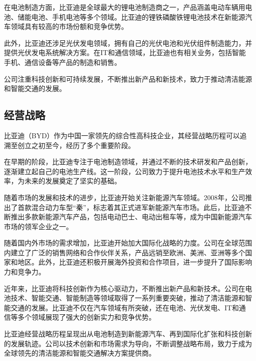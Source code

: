 在电池制造方面，比亚迪是全球最大的锂电池制造商之一，产品涵盖电动车辆用电池、储能电池、手机电池等多个领域。比亚迪的锂铁磷酸铁锂电池技术在新能源汽车领域具有较高的市场份额和竞争优势。

此外，比亚迪还涉足光伏发电领域，拥有自己的光伏电池和光伏组件制造能力，并提供光伏发电系统解决方案。在IT和通信领域，比亚迪也有相关业务，包括智能手机、通信设备等产品的制造和销售。

公司注重科技创新和可持续发展，不断推出新产品和新技术，致力于推动清洁能源和智能交通的发展。
\subsection{经营战略}
比亚迪（BYD）作为中国一家领先的综合性高科技企业，其经营战略历程可以追溯至创立之初至今，经历了多个重要阶段。

在早期的阶段，比亚迪专注于电池制造领域，并通过不断的技术研发和产品创新，逐渐建立起自己的电池生产线。这一阶段，公司致力于提升电池技术水平和生产效率，为未来的发展奠定了坚实的基础。

随着市场的发展和技术的进步，比亚迪开始关注新能源汽车领域。2008年，公司推出了首款混合动力车型“秦”，标志着其正式进军新能源汽车市场。此后，比亚迪不断推出多款新能源汽车产品，包括电动巴士、电动出租车等，成为中国新能源汽车市场的领军企业之一。

随着国内外市场的需求增加，比亚迪开始加大国际化战略的力度。公司在全球范围内建立了广泛的销售网络和合作伙伴关系，产品远销至欧洲、美洲、亚洲等多个国家和地区。此外，比亚迪还积极开展海外投资和合作项目，进一步提升了国际影响力和竞争力。

近年来，比亚迪将科技创新作为核心驱动力，不断推出新产品和新技术。公司在电池技术、智能交通、智能制造等领域取得了一系列重要突破，推动了清洁能源和智能交通的发展。比亚迪不仅在汽车领域有所突破，还在电池、光伏发电、IT和通信等多个领域展现了强大的创新实力和竞争优势。

比亚迪经营战略历程呈现出从电池制造到新能源汽车、再到国际化扩张和科技创新的发展轨迹。公司以技术创新和市场需求为导向，不断调整战略布局，致力于成为全球领先的清洁能源和智能交通解决方案提供商。
